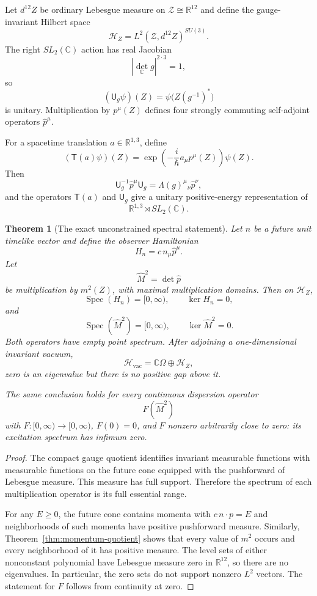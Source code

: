 \documentclass[11pt]{article}
\newtheorem{theorem}{Theorem}[section]
\theoremstyle{definition}
\newcommand{\C}{\mathbb C}
\newcommand{\R}{\mathbb R}
\newcommand{\Spec}{\operatorname{Spec}}
\newcommand{\cH}{\mathscr H}
\newcommand{\cZ}{\mathscr Z}
\begin{document}
Let $d^{12}Z$ be ordinary Lebesgue measure on $\cZ\cong\R^{12}$ and define the gauge-invariant Hilbert space
\[
 \cH_Z=L^2(\cZ,d^{12}Z)^{SU(3)}.
\]
The right $SL_2(\C)$ action has real Jacobian
\[
 |\det_\C g|^{2\cdot3}=1,
\]
so
\[
 (\mathsf U_g\psi)(Z)=\psi\bigl(Z(g^{-1})^*\bigr)
\]
is unitary.  Multiplication by $p^\mu(Z)$ defines four strongly commuting self-adjoint operators $\widehat p^\mu$.

For a spacetime translation $a\in\R^{1,3}$, define
\[
 (\mathsf T(a)\psi)(Z)
 =\exp\left(-\frac{i}{\hbar}a_\mu p^\mu(Z)\right)\psi(Z).
\]
Then
\[
 \mathsf U_g^{-1}\widehat p^\mu\mathsf U_g
 =\Lambda(g)^\mu{}_{\nu}\widehat p^\nu,
\]
and the operators $\mathsf T(a)$ and $\mathsf U_g$ give a unitary positive-energy representation of
\[
 \R^{1,3}\rtimes SL_2(\C).
\]

\begin{theorem}[The exact unconstrained spectral statement]\label{thm:unconstrained-spectrum}
Let $n$ be a future unit timelike vector and define the observer Hamiltonian
\[
 H_n=c\,n_\mu\widehat p^\mu.
\]
Let
\[
 \widehat M^2=\det\widehat p
\]
be multiplication by $m^2(Z)$, with maximal multiplication domains.  Then on $\cH_Z$,
\[
 \boxed{
 \Spec(H_n)=[0,\infty),\qquad
 \ker H_n=0,}
\]
and
\[
 \boxed{
 \Spec(\widehat M^2)=[0,\infty),\qquad
 \ker\widehat M^2=0.}
\]
Both operators have empty point spectrum.  After adjoining a one-dimensional invariant vacuum,
\[
 \cH_{\mathrm{vac}}=\C\Omega\oplus\cH_Z,
\]
zero is an eigenvalue but there is no positive gap above it.

The same conclusion holds for every continuous dispersion operator
\[
 F(\widehat M^2)
\]
with $F:[0,\infty)\to[0,\infty)$, $F(0)=0$, and $F$ nonzero arbitrarily close to zero: its excitation spectrum has infimum zero.
\end{theorem}

\begin{proof}
The compact gauge quotient identifies invariant measurable functions with measurable functions on the future cone equipped with the pushforward of Lebesgue measure.  This measure has full support.  Therefore the spectrum of each multiplication operator is its full essential range.

For any $E\geq0$, the future cone contains momenta with $c\,n\cdot p=E$ and neighborhoods of such momenta have positive pushforward measure.  Similarly, Theorem~\ref{thm:momentum-quotient} shows that every value of $m^2$ occurs and every neighborhood of it has positive measure.  The level sets of either nonconstant polynomial have Lebesgue measure zero in $\R^{12}$, so there are no eigenvalues.  In particular, the zero sets do not support nonzero $L^2$ vectors.  The statement for $F$ follows from continuity at zero.
\end{proof}
\end{document}

